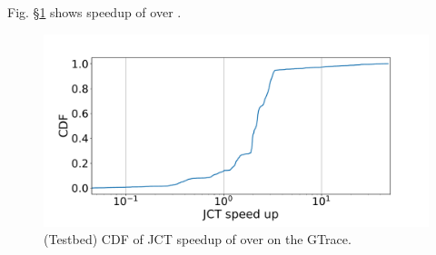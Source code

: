 Fig. \S\ref{fig:testbed:jctSpeedup3Sigma} shows speedup of \name over \primarybase.
\begin{figure}[tp]
\centering
\includegraphics[width=0.9\linewidth]{figures/testbed/result_analysis-testbed-gTrace-durComp50-Patience-3Sigma-speedUp-CDF.pdf}
\vspace{-0.1in}
	\caption{(Testbed) CDF of JCT speedup of \name over \primarybase on the GTrace.}
\label{fig:testbed:jctSpeedup3Sigma}
\vspace{-0.2in}
\end{figure}
